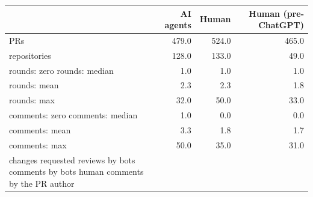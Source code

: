 \begin{tabular}{lrrr}
\toprule
 & AI agents & Human & Human (pre-ChatGPT) \\
\midrule
PRs & 479.0 & 524.0 & 465.0 \\
repositories & 128.0 & 133.0 & 49.0 \\
rounds: zero %
rounds: median & 1.0 & 1.0 & 1.0 \\
rounds: mean & 2.3 & 2.3 & 1.8 \\
rounds: max & 32.0 & 50.0 & 33.0 \\
comments: zero %
comments: median & 1.0 & 0.0 & 0.0 \\
comments: mean & 3.3 & 1.8 & 1.7 \\
comments: max & 50.0 & 35.0 & 31.0 \\
changes requested %
reviews by bots %
comments by bots %
human comments by the PR author %
\bottomrule
\end{tabular}
